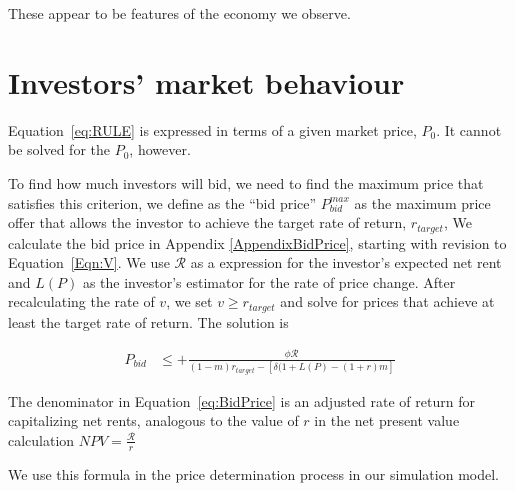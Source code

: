 These appear to be features of the economy we observe.


\section{Investors' market behaviour}


Equation~\ref{eq:RULE} is expressed in terms of a given market price, $P_0$. It cannot be solved for the $P_0$, however.

To find how much investors will bid, we need to find the maximum price that satisfies this criterion, we define as the ``bid price'' $P^{max}_{bid}$  as the maximum price offer that allows the investor to achieve the target rate of return, $r_{target}$,   %
We calculate the bid price in Appendix \ref{AppendixBidPrice}, starting with revision to Equation~\ref{Eqn:V}. We use $\mathcal{R}$ as a  expression for the investor's expected net rent and $L(P)$ as the investor's  estimator for the rate of price change. After recalculating the rate of $v$, we set $v \ge r_{target}$ and solve for  prices that achieve at least the target rate of return. The solution is 

\begin{align}
P_{bid} &\le    +\frac{\phi \mathcal{R}}{(1-m)r_{target}-\left[ \delta(1+L(P)- (1+r)m\right]} \label{eq:BidPrice}
\end{align}

The denominator in Equation~\ref{eq:BidPrice}  is an adjusted rate of return for capitalizing net rents, analogous to the value of $r$ in the net present value calculation $NPV=\frac{\mathcal{R}}{r}$ 

We use this formula in the price determination process in our simulation model. 



